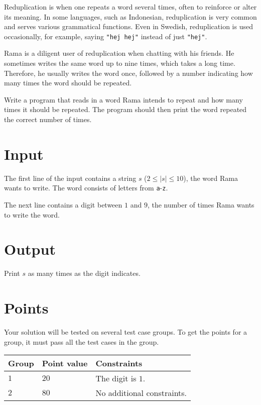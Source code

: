 \noindent

Reduplication is when one repeats a word several times, often to reinforce or alter its meaning.
In some languages, such as Indonesian, reduplication is very common and
serves various grammatical functions. Even in Swedish, reduplication is used
occasionally, for example, saying \texttt{"hej hej"} instead of just \texttt{"hej"}.

Rama is a diligent user of reduplication when chatting with his friends. He sometimes
writes the same word up to nine times, which takes a long time. Therefore, he usually
writes the word once, followed by a number indicating how many times the word should
be repeated.

Write a program that reads in a word Rama intends to repeat and how many times it
should be repeated. The program should then print the word repeated the correct number of times.

\section*{Input}
The first line of the input contains a string $s$ ($2 \leq |s| \leq 10$), the word Rama wants to write.
The word consists of letters from \texttt{a}-\texttt{z}.

The next line contains a digit between $1$ and $9$, the number of times Rama wants to write the word.

\section*{Output}
Print $s$ as many times as the digit indicates. 

\section*{Points}
Your solution will be tested on several test case groups.
To get the points for a group, it must pass all the test cases in the group.

\noindent
\begin{tabular}{| l | l | p{12cm} |}
  \hline
  \textbf{Group} & \textbf{Point value} & \textbf{Constraints} \\ \hline
  $1$    & $20$       & The digit is $1$. \\ \hline
  $2$    & $80$       & No additional constraints. \\ \hline
\end{tabular}
